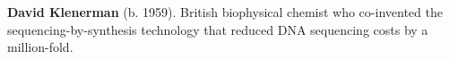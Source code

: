 \textbf{David Klenerman} (b. 1959). British biophysical chemist who co-invented the sequencing-by-synthesis technology that reduced DNA sequencing costs by a million-fold.

